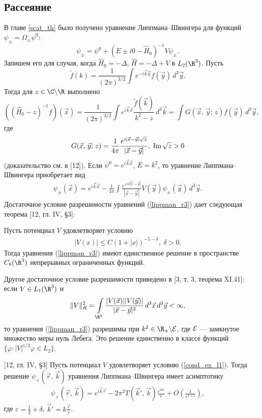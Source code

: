 \documentclass[a4paper
]{article}
\begin{document}
\subsection{Рассеяние}
В главе \ref{scat_th} было получено уравнение Липпмана--Швингера
для функций $\psi_{\pm}=\Omega_{\pm}\psi^0$:
$$\psi_{\pm}=\psi^0+\left(E\pm i0-\hat H_0\right)^{-1}V\psi_{\pm}.$$
Запишем его для случая, когда $\hat H_0=-\Delta$, $\hat H=-\Delta+V$
в $L_2(\R^3)$. Пусть $$\tilde f(k)=\frac{1}{(2\pi)^{3/2}}\int e^{-i\vec k
\vec y}f(\vec y)\, d^3\vec y.$$ Тогда для $z\in \C\backslash \R$ выполнено
$$\left((\hat H_0-z)^{-1}f\right)(\vec x)=\frac{1}{(2\pi)^{3/2}}\int
e^{i\vec k\vec x}\frac{\tilde f(\vec k)}{k^2-z}\, d^3\vec k=\int
G(\vec x, \, \vec y;\, z)f(\vec y)\, d^3\vec y,$$ где
$$G(\vec x, \, \vec y;\, z)=\frac{1}{4\pi}
\frac{e^{i|\vec x-\vec y|\sqrt{z}}}{|\vec x-\vec y|}, \; {\rm Im}\,
\sqrt{z}>0$$ (доказательство см. в [12]). Если $\psi^0=e^{i\vec k\vec x}$,
$E=k^2$, то уравнение Липпмана--Швингера приобретает вид
\begin{align}
\label{lippman_r3}
\psi_{\pm}(\vec x)=e^{i\vec k\vec x}-\frac{1}{4\pi}\int \frac{e^{\pm ik
|\vec x-\vec y|}}{|\vec x-\vec y|}V(\vec y)\psi_{\pm}(\vec y)\, d^3\vec y.
\end{align}
Достаточное условие разрешимости уравнений (\ref{lippman_r3}) дает
следующая теорема [12, гл. IV, \S 3]:
\begin{Trm}
Пусть потенциал $V$ удовлетворяет условию
\begin{align}
\label{cond_ex_l1}
|V(x)|\le C\left(1+|x|\right)^{-5-\delta}, \; \delta>0.
\end{align}
Тогда уравнения (\ref{lippman_r3}) имеют единственное решение в
пространстве $C_b(\R^3)$ непрерывных ограниченных функций.
\end{Trm}
Другое достаточное условие разрешимости приведено в [3, т. 3, теорема
XI.41]: если $V\in L_1(\R^3)$ и
$$\|V\|^2_R=\int \limits_{\R^6}\frac{|V(\vec x)||V(\vec y)|}{|\vec x-\vec
y|^2}\, d^3\vec x\, d^3\vec y<\infty,$$ то уравнения (\ref{lippman_r3})
разрешимы при $k^2\in \R_+\backslash {\cal E}$, где ${\cal E}$ ---
замкнутое множество меры нуль Лебега. Это решение единственно в классе
функций $\{\varphi:|V|^{1/2}\varphi\in L_2\}$. \par
\begin{Trm} {\rm [12, гл. IV, \S 3]}
Пусть потенциал $V$ удовлетворяет условию (\ref{cond_ex_l1}). Тогда
решение $\psi_+(\vec r, \, \vec k)$ уравнения Липпмана--Швингера
имеет асимптотику
\begin{align}
\label{lippman_asympt}
\psi_+(\vec r, \, \vec k)=e^{i\vec k\vec r}
-2\pi^2T(\vec k', \, \vec k)\frac{e^{ikr}}{r}+O\left(\frac{1}{r^{1+
\varepsilon}}\right),
\end{align}
где $\varepsilon=\frac12+\delta$, $\vec k'=k\frac{\vec r}{r}$.
\end{Trm}
\end{document}
